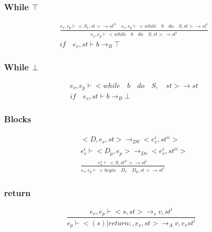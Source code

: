 \subsubsection{While $\top$}
\begin{align*}
	&\frac { { e }_{ v },{ e }_{ p }\vdash <{ S }_{ 1 },st>\rightarrow { st }^{ ii }\quad { e }_{ v },{ e }_{ p }\vdash <while\quad b\quad do\quad S,st>\rightarrow { st }^{ i } }{ { e }_{ v },{ e }_{ p }\vdash <while\quad b\quad do\quad S,st>\rightarrow { st }^{ i } }\\
	&if\quad { e }_{ v },st\vdash b{ \rightarrow  }_{ B }\top 
\end{align*}


\subsubsection{While $\bot$}
\begin{align*}
	&{ e }_{ v },{ e }_{ p }\vdash <while\quad b\quad do\quad S,\quad st>\rightarrow st\\
	&if\quad { e }_{ v },st\vdash b{ \rightarrow  }_{ B }\bot
\end{align*}

\subsubsection{Blocks}
\begin{align*}
&<D,{ e }_{ v },st>{ \rightarrow  }_{ DV }<{ e }_{ v }^{ i },{ st }^{ ii }>\\
&{ e }_{ v }^{ i }\vdash <{ D }_{ p },{ e }_{ p }>{ \rightarrow  }_{ Dv }<{ e }_{ v }^{ i },{ st }^{ ii }>\\
&\frac { { e }_{ v }^{ i }\vdash <S,{ st }^{ ii }>\rightarrow { st }^{ i } }{ { e }_{ v },{ e }_{ p }\vdash <begin\quad { D }_{ v }\quad { D }_{ p },st>\rightarrow { st }^{ i } } 
\end{align*}

\subsubsection{return}
\begin{equation}
	\frac { { e }_{ v },{ e }_{ p }\vdash <{ s },st>{ \rightarrow  }_{ s }v,{ st }^{ i } }{ { e }_{ p }\vdash <(s)|return;,{ e }_{ v },st>{ \rightarrow  }_{ A }v,{ e }_{ v }{ st }^{ i } } 
\end{equation}